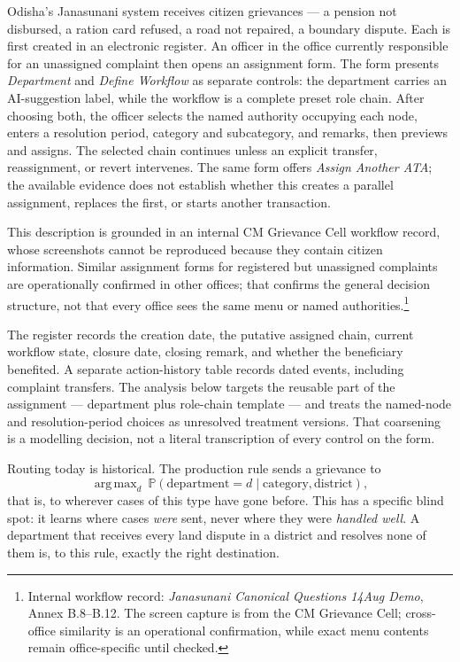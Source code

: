 \documentclass[11pt,a4paper]{article}
\theoremstyle{plain}
\theoremstyle{definition}
\theoremstyle{remark}
\DeclareMathOperator*{\argmax}{arg\,max}
\newcommand{\Prob}{\mathbb P}
\begin{document}
Odisha's Janasunani system receives citizen grievances --- a pension not disbursed, a ration
card refused, a road not repaired, a boundary dispute. Each is first created in an electronic
register. An officer in the office currently responsible for an unassigned complaint then opens
an assignment form. The form presents \emph{Department} and \emph{Define Workflow} as separate
controls: the department carries an AI-suggestion label, while the workflow is a complete preset
role chain. After choosing both, the officer selects the named authority occupying each node,
enters a resolution period, category and subcategory, and remarks, then previews and assigns.
The selected chain continues unless an explicit transfer, reassignment, or revert intervenes.
The same form offers \emph{Assign Another ATA}; the available evidence does not establish
whether this creates a parallel assignment, replaces the first, or starts another transaction.

This description is grounded in an internal CM Grievance Cell workflow record, whose screenshots
cannot be reproduced because they contain citizen information. Similar assignment forms for
registered but unassigned complaints are operationally confirmed in other offices; that confirms
the general decision structure, not that every office sees the same menu or named authorities.\footnote{Internal
workflow record: \emph{Janasunani Canonical Questions 14Aug Demo}, Annex B.8--B.12. The screen
capture is from the CM Grievance Cell; cross-office similarity is an operational confirmation,
while exact menu contents remain office-specific until checked.}

The register records the creation date, the putative assigned chain, current workflow state,
closure date, closing remark, and whether the beneficiary benefited. A separate action-history
table records dated events, including complaint transfers. The analysis below targets the
reusable part of the assignment --- department plus role-chain template --- and treats the
named-node and resolution-period choices as unresolved treatment versions. That coarsening is a
modelling decision, not a literal transcription of every control on the form.

Routing today is historical. The production rule sends a grievance to
\[
\argmax_{d}\ \Prob(\text{department}=d \mid \text{category}, \text{district}),
\]
that is, to wherever cases of this type have gone before. This has a specific blind spot: it
learns where cases \emph{were} sent, never where they were \emph{handled well}. A department
that receives every land dispute in a district and resolves none of them is, to this rule,
exactly the right destination.
\end{document}
